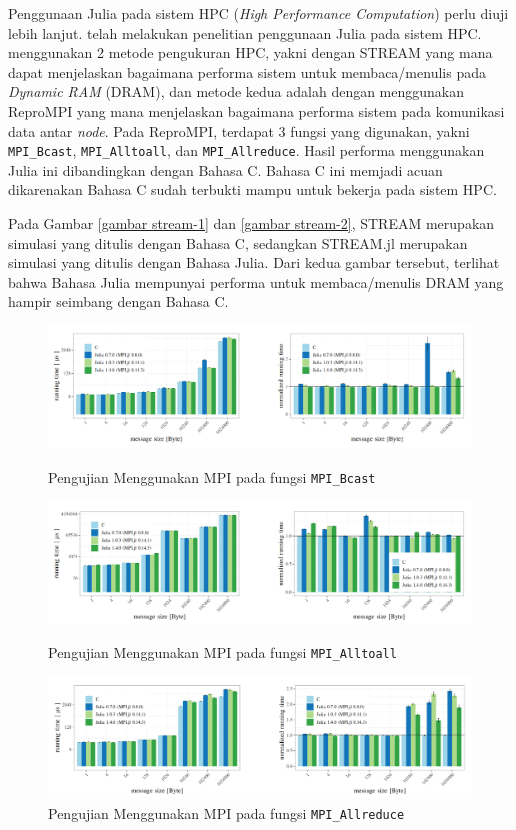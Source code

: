 Penggunaan Julia pada sistem HPC (\emph{High Performance Computation}) perlu
diuji lebih lanjut. \cite{hunoldBenchmarkingJuliaCommunication2020} telah
melakukan penelitian penggunaan Julia pada sistem HPC.
\cite{hunoldBenchmarkingJuliaCommunication2020} menggunakan 2 metode pengukuran
HPC, yakni dengan STREAM yang mana dapat menjelaskan bagaimana performa sistem
untuk membaca/menulis pada \emph{Dynamic RAM} (DRAM), dan metode kedua adalah
dengan menggunakan ReproMPI yang mana menjelaskan bagaimana performa sistem
pada komunikasi data antar \emph{node}. Pada ReproMPI, terdapat 3 fungsi yang
digunakan, yakni \texttt{MPI\_Bcast}, \texttt{MPI\_Alltoall}, dan
\texttt{MPI\_Allreduce}. Hasil performa menggunakan Julia ini dibandingkan
dengan Bahasa C. Bahasa C ini memjadi acuan dikarenakan Bahasa C sudah terbukti
mampu untuk bekerja pada sistem HPC.

Pada Gambar \ref{gambar stream-1} dan \ref{gambar stream-2}, STREAM merupakan
simulasi yang ditulis dengan Bahasa C, sedangkan STREAM.jl merupakan simulasi
yang ditulis dengan Bahasa Julia. Dari kedua gambar tersebut, terlihat bahwa
Bahasa Julia mempunyai performa untuk membaca/menulis DRAM yang hampir seimbang
dengan Bahasa C.

\begin{figure}[H]
  \centering
  \includegraphics[width=14cm]{images/mpi-1.png}
  \caption{Pengujian Menggunakan MPI pada fungsi \texttt{MPI\_Bcast}}
  \label{gambar mpi-1 bcast}

  \includegraphics[width=14cm]{images/mpi-2.png}
  \caption{Pengujian Menggunakan MPI pada fungsi \texttt{MPI\_Alltoall}}
  \label{gambar mpi-2 alltoall}

  \includegraphics[width=14cm]{images/mpi-3.png}
  \caption{Pengujian Menggunakan MPI pada fungsi \texttt{MPI\_Allreduce}}
  \label{gambar mpi-3 allreduce}
\end{figure}

